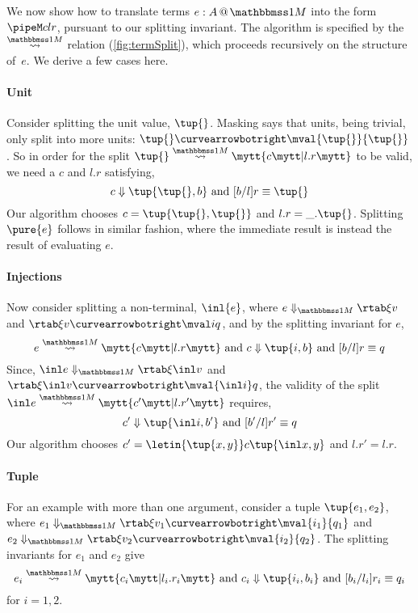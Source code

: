 \begin{abstrsyn}
We now show how to translate terms $\colmix e A$ into the form $\pipeM c l r$,
pursuant to our splitting invariant.
The algorithm is specified by the $\splitonesym$ relation (\cref{fig:termSplit}), 
which proceeds recursively on the structure of~$e$. We derive a few cases here.

\paragraph {Unit} 
Consider splitting the unit value, $\tup{}$.
Masking says that units, being trivial, only split into more units: $\tup{} \vsplito \mval {\tup{}} {\tup{}}$.
So in order for the split $\splitone {\tup {}} A c {l.r}$ to be valid, 
we need a $c$ and $l.r$ satisfying,
\[
	\reduce c {\tup{\tup{},b}} \text{ and } [b/l]r \equiv \tup{}
\]
Our algorithm chooses $c=\tup{\tup{},\tup{}}$ and $l.r = \_.\tup{}$.
Splitting $\pure{e}$ follows in similar fashion, 
where the immediate result is instead the result of evaluating $e$.

\paragraph {Injections} 
Now consider splitting a non-terminal, $\inl {e}$,
where $\diaone {e} \xi v$ and $\rtab \xi v \vsplito \mval i q$, 
and by the splitting invariant for $e$,
\[
	\splitone e A c {l.r} \text{ and } \reduce c {\tup{i,b}} \text{ and } [b/l]r \equiv q
\]
Since, $\diaone {\inl e} \xi {\inl v}$ and $\rtab \xi {\inl v} \vsplito \mval {\inl i} q$,
the validity of the split $\splitone {\inl e} A {c'} {l.r'}$ requires,
\[
	\reduce {c'} {\tup{\inl i,b'}} \text{ and } [b'/l]r' \equiv q
\]
Our algorithm chooses $c' = \letin {\tup {x,y}} c {\tup{\inl x, y}}$ and $l.r' = l.r$.

\paragraph{Tuple} 
For an example with more than one argument, consider a tuple $\tup{e_1,e_2}$,
where $\diaone {e_1} \xi {v_1} \vsplito \mval {i_1} {q_1}$
and $\diaone {e_2} \xi {v_2} \vsplito \mval {i_2} {q_2}$.
The splitting invariants for $e_1$ and $e_2$ give
\[
	\splitone {e_i} A {c_i} {l_i.r_i} \text{ and } \reduce {c_i} {\tup{i_i,b_i}} \text{ and } [b_i/l_i]r_i \equiv q_i
\]
for $i=1,2$.



\end{abstrsyn}
